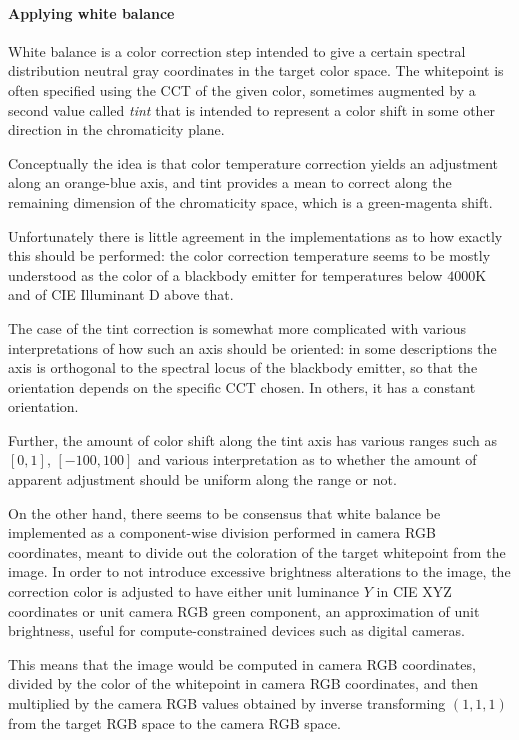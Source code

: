 \paragraph{Applying white balance}
White balance is a color correction step intended to give a certain spectral distribution 
 neutral gray coordinates in the target color space.
The whitepoint is often specified using the \gls{CCT} of the given color,
sometimes augmented by a second value called \textsl{tint} that is intended to represent a color shift 
in some other direction in the chromaticity plane. 
    
    Conceptually the idea is that
color temperature correction yields an adjustment along an orange-blue axis, and tint provides
a mean to correct along the remaining dimension of the chromaticity space, which is a green-magenta shift.

Unfortunately there is little agreement in the implementations as to how exactly this should be performed:
the color correction temperature seems to be mostly understood as the color of a blackbody emitter for
temperatures below $4000\si{\kelvin}$ and of \gls{CIE} Illuminant D above that. 

The case of the tint correction is somewhat more complicated with various interpretations 
of how such an axis should be oriented: in some descriptions the axis is orthogonal to the 
spectral locus of the blackbody emitter, so that the orientation depends on the specific 
\gls{CCT} chosen. In others, it has a constant orientation. 

Further, the amount of color shift along the tint axis has various ranges such as $[0,1]$, 
$[-100,100]$ and various interpretation as to whether the amount of apparent adjustment should be 
uniform along the range or not.

On the other hand, there seems to be consensus that white balance be implemented as a component-wise
division performed in camera \gls{RGB} coordinates, meant to divide out the coloration of the target
whitepoint from the image. In order to not introduce excessive brightness alterations
to the image, the correction color is adjusted to have either unit luminance $Y$ in \gls{CIE} \gls{XYZ} 
coordinates or unit camera \gls{RGB} green component, an approximation of unit brightness, 
useful for compute-constrained devices such as digital cameras. 

This means that the image would be computed in camera \gls{RGB} coordinates, divided by the color of 
the whitepoint in camera \gls{RGB} coordinates, and then multiplied by the camera \gls{RGB} values 
obtained by inverse transforming $(1,1,1)$ from the target \gls{RGB} space to the camera \gls{RGB} 
space.

